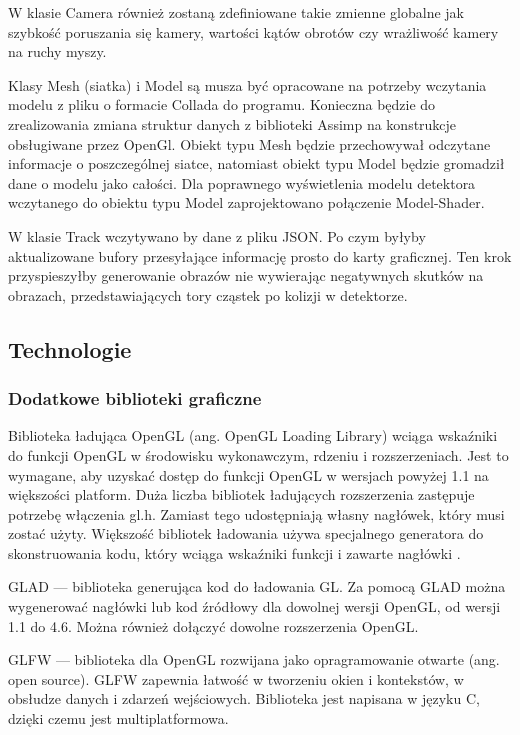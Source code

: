 W klasie Camera również zostaną zdefiniowane takie zmienne globalne jak szybkość poruszania się kamery, wartości kątów obrotów czy wrażliwość kamery na ruchy myszy.

Klasy Mesh (siatka) i Model są musza być opracowane na potrzeby wczytania modelu z pliku o formacie Collada do programu. Konieczna będzie do zrealizowania zmiana struktur danych z biblioteki Assimp na konstrukcje obsługiwane przez OpenGl. Obiekt typu Mesh będzie przechowywał odczytane informacje o poszczególnej siatce, natomiast obiekt typu Model będzie gromadził dane o modelu jako całości. Dla poprawnego wyświetlenia modelu detektora wczytanego do obiektu typu Model zaprojektowano połączenie Model-Shader.

W klasie Track wczytywano by dane z pliku JSON. Po czym byłyby aktualizowane bufory przesyłające informację prosto do karty graficznej. Ten krok przyspieszyłby generowanie obrazów nie wywierając negatywnych skutków na obrazach, przedstawiających tory cząstek po kolizji w detektorze.

\newpage
\subsection{Technologie}
\subsubsection{Dodatkowe biblioteki graficzne}
Biblioteka ładująca OpenGL (ang. OpenGL Loading Library) wciąga wskaźniki do funkcji OpenGL w środowisku wykonawczym, rdzeniu i rozszerzeniach. Jest to wymagane, aby uzyskać dostęp do funkcji OpenGL w wersjach powyżej 1.1 na większości platform. Duża liczba bibliotek ładujących rozszerzenia zastępuje potrzebę włączenia gl.h. Zamiast tego udostępniają własny nagłówek, który musi zostać użyty. Większość bibliotek ładowania używa specjalnego generatora do skonstruowania kodu, który wciąga wskaźniki funkcji i zawarte nagłówki \cite{LoadingLibrary}. 

GLAD --- biblioteka generująca kod do ładowania GL. Za pomocą GLAD można wygenerować nagłówki lub kod źródłowy dla dowolnej wersji OpenGL, od wersji 1.1 do 4.6. Można również dołączyć dowolne rozszerzenia OpenGL.

GLFW --- biblioteka dla OpenGL rozwijana jako opragramowanie otwarte (ang. open source). GLFW zapewnia łatwość w tworzeniu okien i kontekstów, w obsłudze danych i zdarzeń wejściowych. Biblioteka jest napisana w języku C, dzięki czemu jest multiplatformowa.  

